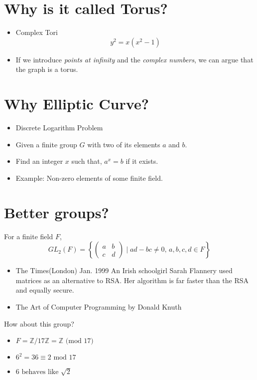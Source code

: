 \section*{Why is it called Torus?}
\begin{itemize}
	\item Complex Tori \[
	y^2=x(x^2-1)
	\]
	\item If we introduce \textit{points at infinity} and the \textit{complex numbers}, we can argue that the graph is a torus.
\end{itemize}

\section*{Why Elliptic Curve?}

\begin{itemize}
	\item Discrete Logarithm Problem
	\item Given a finite group \( G \) with two of its elements \( a \) and \( b \).
	\item Find an integer \( x \) such that, \( a^x = b \) if it exists.
	\item Example: Non-zero elements of some finite field.
\end{itemize}

\section*{Better groups?}

For a finite field \( F \),
\[
GL_2(F) = \left\{ \begin{pmatrix}
	a & b \\
	c & d
\end{pmatrix} \mid ad - bc \neq 0, \, a,b,c,d \in F \right\}
\]

\begin{itemize}
	\item The Times(London) Jan. 1999 An Irish schoolgirl Sarah Flannery used matrices as an alternative to RSA. Her algorithm is far faster than the RSA and equally secure.
	\item The Art of Computer Programming by Donald Knuth
\end{itemize}

How about this group?

\begin{itemize}
	\item \( F = \mathbb{Z} / 17\mathbb{Z} = \mathbb{Z} \text{ (mod 17)} \)
	\item \( 6^2 = 36 \equiv 2 \text{ mod 17} \)
	\item \( 6 \text{ behaves like } \sqrt{2} \)
\end{itemize}

